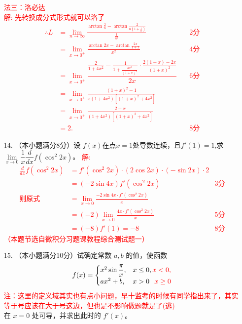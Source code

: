 \documentclass[a4paper,12pt]{article}
\begin{document}
\begin{enumerate}
    \textcolor{red}{
    法三：洛必达\\[0.5em]
    解: 先转换成分式形式就可以洛了
    \begin{align*}
    \therefore L
    &= \lim_{n \to \infty} \frac{\arctan \frac{2}{n} - \arctan \frac{2}{n\left(1+\frac{1}{n}\right)}}{\frac{1}{n^2}}  \quad & \text{2分}\\
    &= \lim_{x \to 0^+} \frac{\arctan{2x} - \arctan \frac{2x}{1+x}}{x^2}  \quad & \text{4分}\\
    &= \lim_{x \to 0^+} \dfrac{\frac{2}{1 + 4x^2} - \frac{1}{1 + \frac{4x^2}{(1 + x)^2}} \cdot \frac{2(1 + x) - 2x}{(1 + x)^2}}{2x}  \quad & \text{6分}\\
    &= \lim_{x \to 0^+} \frac{(1 + x)^2 - 1}{x(1 + 4x^2)[(1 + x)^2 + 4x^2]}\\
    &= \lim_{x \to 0^+} \frac{2 + x}{(1 + 4x^2)[(1 + x)^2 + 4x^2]} \\
    &= 2. \quad & \text{8分}
    \end{align*}
    }



    \item[14.]（本小题满分8分）设 $f(x) $在点$x=1 $处导数连续，且$f'(1)=1$,求$\underset{x \to 0}{\lim}\dfrac{1}{x}\dfrac{d}{dx}f(\cos^2{2x})$。
    \textcolor{red}{
        解:
        \begin{align*}
        \frac{d}{dx} f(\cos^2 2x) 
        &= f'(\cos^2 2x) \cdot (2 \cos 2x) \cdot (-\sin 2x) \cdot 2 \\
        &= (-2 \sin 4x) f'(\cos^2 2x) \quad & \text{3分} \\
        \text{则原式}
        &= \lim_{x \to 0} \frac{-2 \sin 4x \cdot f'(\cos^2 2x)}{x} \\
        &= (-2) \lim_{x \to 0} \frac{4x \cdot f'(\cos^2 2x)}{x} \quad & \text{5分} \\
        &= (-8) f'(1) = -8 \quad & \text{8分}
        \end{align*}
        （本题节选自微积分习题课教程综合测试题一）
    }
    \item[15.]（本小题满分10分）试确定常数 \( a, b \) 的值，使函数
    \[
    f(x) = \begin{cases}
        x^2 \sin{\dfrac{\pi}{x}}, & x \leq 0, \hfill \textcolor{red}{x < 0,}\\
        ax^2 + b, & x > 0 \hfill \textcolor{red}{x \geq 0}
    \end{cases}
    \]
    \textcolor{red}{注：这里的定义域其实也有点小问题，早十监考的时候有同学指出来了，其实等于号应该在大于号这边，但也是不影响做题就是了(逃)}\\
    在 \( x = 0 \) 处可导，并求出此时的 \( f'(x) \)。


\end{enumerate}
\end{document}
